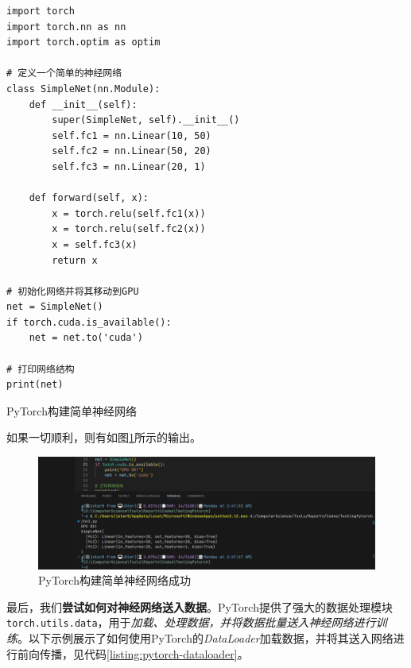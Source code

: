 \begin{longlisting}
    \begin{verbatim}
import torch
import torch.nn as nn
import torch.optim as optim

# 定义一个简单的神经网络
class SimpleNet(nn.Module):
    def __init__(self):
        super(SimpleNet, self).__init__()
        self.fc1 = nn.Linear(10, 50)
        self.fc2 = nn.Linear(50, 20)
        self.fc3 = nn.Linear(20, 1)

    def forward(self, x):
        x = torch.relu(self.fc1(x))
        x = torch.relu(self.fc2(x))
        x = self.fc3(x)
        return x

# 初始化网络并将其移动到GPU
net = SimpleNet()
if torch.cuda.is_available():
    net = net.to('cuda')

# 打印网络结构
print(net)
    \end{verbatim}
    \caption{PyTorch构建简单神经网络}
    \label{listing:pytorch-nn}
\end{longlisting}

如果一切顺利，则有如图\ref{fig:pytorch-nn}所示的输出。

\begin{figure}[htbp]
    \centering
    \includegraphics[width=\textwidth]{Figures/nn1.png}
    \caption{PyTorch构建简单神经网络成功}
    \label{fig:pytorch-nn}
\end{figure}

最后，我们\textbf{尝试如何对神经网络送入数据}。PyTorch提供了强大的数据处理模块\texttt{torch.utils.data}，用于\textit{加载、处理数据，并将数据批量送入神经网络进行训练}。以下示例展示了如何使用PyTorch的\textit{DataLoader}加载数据，并将其送入网络进行前向传播，见代码\ref{listing:pytorch-dataloader}。

